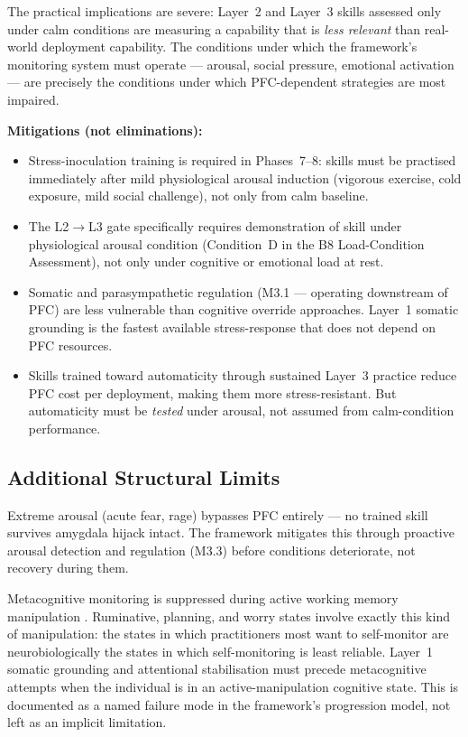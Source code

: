 \documentclass[12pt, a4paper]{article}
\begin{document}
The practical implications are severe: Layer~2 and Layer~3 skills assessed only
under calm conditions are measuring a capability that is \emph{less relevant} than
real-world deployment capability. The conditions under which the framework's
monitoring system must operate --- arousal, social pressure, emotional activation --- are
precisely the conditions under which PFC-dependent strategies are most impaired.

\textbf{Mitigations (not eliminations):}
\begin{itemize}[leftmargin=2em]
\item Stress-inoculation training is required in Phases~7--8: skills must be
practised immediately after mild physiological arousal induction (vigorous exercise,
cold exposure, mild social challenge), not only from calm baseline.
\item The L2$\to$L3 gate specifically requires demonstration of skill under
physiological arousal condition (Condition~D in the B8 Load-Condition Assessment),
not only under cognitive or emotional load at rest.
\item Somatic and parasympathetic regulation (M3.1 --- operating downstream of PFC)
are less vulnerable than cognitive override approaches. Layer~1 somatic grounding
is the fastest available stress-response that does not depend on PFC resources.
\item Skills trained toward automaticity through sustained Layer~3 practice reduce
PFC cost per deployment, making them more stress-resistant. But automaticity must
be \emph{tested} under arousal, not assumed from calm-condition performance.
\end{itemize}

\subsection{Additional Structural Limits}

Extreme arousal (acute fear, rage) bypasses PFC entirely --- no trained skill
survives amygdala hijack intact. The framework mitigates this through proactive
arousal detection and regulation (M3.3) before conditions deteriorate, not recovery
during them.

Metacognitive monitoring is suppressed during active working memory manipulation
\citep{maniscalco2015}. Ruminative, planning, and worry states involve exactly this
kind of manipulation: the states in which practitioners most want to self-monitor
are neurobiologically the states in which self-monitoring is least reliable. Layer~1
somatic grounding and attentional stabilisation must precede metacognitive attempts
when the individual is in an active-manipulation cognitive state. This is documented
as a named failure mode in the framework's progression model, not left as an
implicit limitation.
\end{document}
